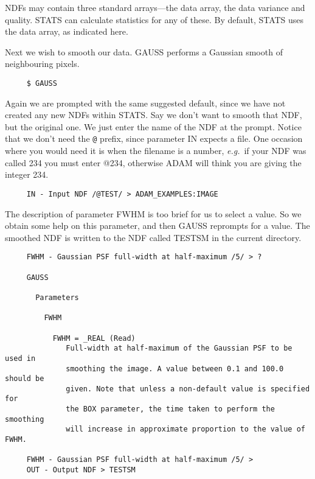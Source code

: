 NDFs may contain three standard arrays---the data array, the data
variance and quality.  STATS can calculate statistics for any of
these.  By default, STATS uses the data array, as indicated here.

Next we wish to smooth our data.  GAUSS performs a Gaussian smooth
of neighbouring pixels.

\small
\begin{verbatim}
     $ GAUSS
\end{verbatim}
\normalsize

Again we are prompted with the same suggested default, since we
have not created any new NDFs within STATS.  Say we don't want to
smooth that NDF, but the original one.  We just enter the name of the
NDF at the prompt.  Notice that we don't need the {\tt @}
prefix, since parameter IN expects a file.  One occasion where you
would need it is when the filename is a number, {\it e.g.}\ if your
NDF was called 234 you must enter @234, otherwise {\small ADAM} will
think you are giving the integer 234.

\small
\begin{verbatim}
     IN - Input NDF /@TEST/ > ADAM_EXAMPLES:IMAGE
\end{verbatim}
\normalsize

The description of parameter FWHM is too brief for us to select a value.
So we obtain some help on this parameter, and then GAUSS reprompts
for a value.  The smoothed NDF is written to the NDF called TESTSM
in the current directory.

\small
\begin{verbatim}
     FWHM - Gaussian PSF full-width at half-maximum /5/ > ?

     GAUSS

       Parameters

         FWHM

           FWHM = _REAL (Read)
              Full-width at half-maximum of the Gaussian PSF to be used in
              smoothing the image. A value between 0.1 and 100.0 should be
              given. Note that unless a non-default value is specified for
              the BOX parameter, the time taken to perform the smoothing
              will increase in approximate proportion to the value of FWHM.
                                                           
     FWHM - Gaussian PSF full-width at half-maximum /5/ >
     OUT - Output NDF > TESTSM
\end{verbatim}
\normalsize


